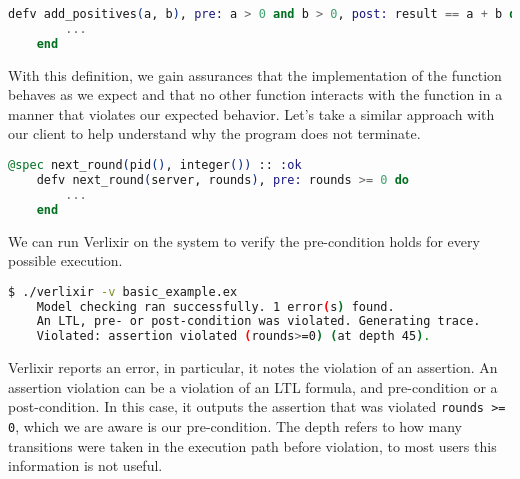 \begin{lstlisting}[language=Elixir, xleftmargin=.0\linewidth, caption={Example usage of pre- and post-conditions in LTLixir}]
    defv add_positives(a, b), pre: a > 0 and b > 0, post: result == a + b do
        ...
    end
\end{lstlisting}
With this definition, we gain assurances that the implementation of the function behaves as we expect and that no other function interacts with the function in a manner that violates our expected behavior. Let's take a similar approach with our client to help understand why the program does not terminate.
\begin{lstlisting}[language=Elixir, xleftmargin=.3\linewidth]
    @spec next_round(pid(), integer()) :: :ok
    defv next_round(server, rounds), pre: rounds >= 0 do
        ...
    end
\end{lstlisting}
We can run Verlixir on the system to verify the pre-condition holds for every possible execution.
\begin{lstlisting}[language=bash, xleftmargin=.1\linewidth]
    $ ./verlixir -v basic_example.ex
    Model checking ran successfully. 1 error(s) found.
    An LTL, pre- or post-condition was violated. Generating trace.
    Violated: assertion violated (rounds>=0) (at depth 45).
\end{lstlisting}
Verlixir reports an error, in particular, it notes the violation of an assertion. An assertion violation can be a violation of an LTL formula, and pre-condition or a post-condition. In this case, it outputs the assertion that was violated \texttt{rounds >= 0}, which we are aware is our pre-condition. The depth refers to how many transitions were taken in the execution path before violation, to most users this information is not useful.
